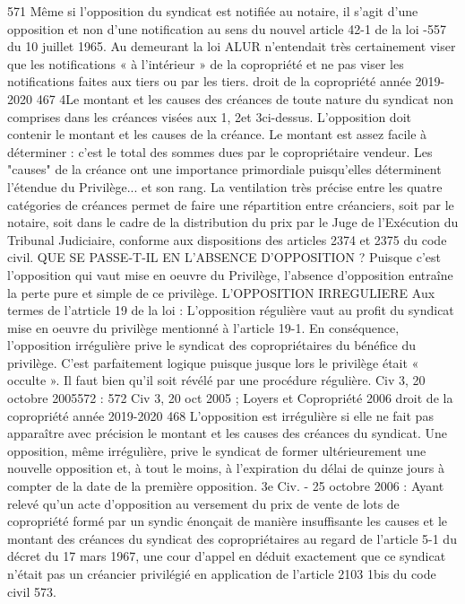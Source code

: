 571 Même si l’opposition du syndicat est notifiée au notaire, il s’agit d’une opposition et non d’une notification au sens du nouvel article 42-1 de la loi -557 du 10 juillet 1965. Au demeurant la loi ALUR n’entendait très certainement viser que les notifications « à l’intérieur » de la copropriété et ne pas viser les notifications faites aux tiers ou par les tiers.
droit de la copropriété année 2019-2020
467
4\degres Le montant et les causes des créances de toute nature du syndicat non comprises dans les créances visées aux 1\degres, 2\degres et 3\degres ci-dessus.
L'opposition doit contenir le montant et les causes de la créance.
Le montant est assez facile à déterminer : c'est le total des sommes dues par le copropriétaire vendeur.
Les "causes" de la créance ont une importance primordiale puisqu'elles déterminent l'étendue du Privilège... et son rang.
La ventilation très précise entre les quatre catégories de créances permet de faire une répartition entre créanciers, soit par le notaire, soit dans le cadre de la distribution du prix par le Juge de l’Exécution du Tribunal Judiciaire, conforme aux dispositions des articles 2374 et 2375 du code civil.
QUE SE PASSE-T-IL EN L'ABSENCE D'OPPOSITION ?
Puisque c'est l'opposition qui vaut mise en oeuvre du Privilège, l'absence d'opposition entraîne la perte pure et simple de ce privilège.
L’OPPOSITION IRREGULIERE
Aux termes de l’atrticle 19 de la loi :
L'opposition régulière vaut au profit du syndicat mise en oeuvre du privilège mentionné à l'article 19-1.
En conséquence, l’opposition irrégulière prive le syndicat des copropriétaires du bénéfice du privilège.
C’est parfaitement logique puisque jusque lors le privilège était « occulte ». Il faut bien qu’il soit révélé par une procédure régulière.
Civ 3\degres, 20 octobre 2005572 :
572 Civ 3\degres, 20 oct 2005 ; Loyers et Copropriété 2006 
droit de la copropriété année 2019-2020
468
L’opposition est irrégulière si elle ne fait pas apparaître avec précision le montant et les causes des créances du syndicat. Une opposition, même irrégulière, prive le syndicat de former ultérieurement une nouvelle opposition et, à tout le moins, à l’expiration du délai de quinze jours à compter de la date de la première opposition.
3e Civ. - 25 octobre 2006 :
Ayant relevé qu’un acte d’opposition au versement du prix de vente de lots de copropriété formé par un syndic énonçait de manière insuffisante les causes et le montant des créances du syndicat des copropriétaires au regard de l’article 5-1 du décret du 17 mars 1967, une cour d’appel en déduit exactement que ce syndicat n’était pas un créancier privilégié en application de l’article 2103 1\degres bis du code civil 573.
